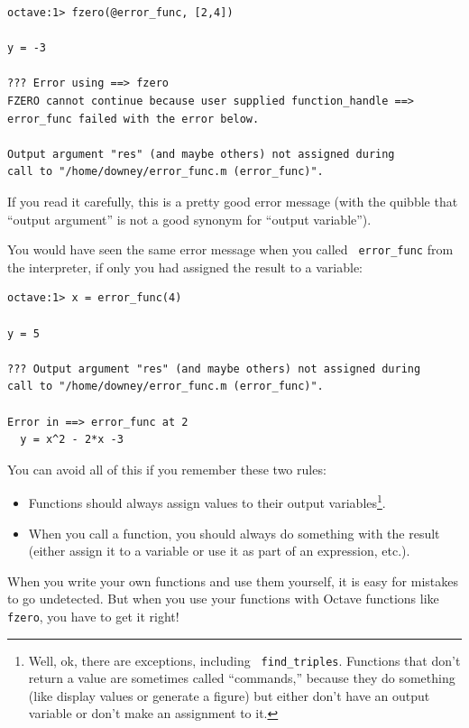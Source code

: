 \documentclass{book}
\begin{document}
\begin{verbatim}
octave:1> fzero(@error_func, [2,4])

y = -3

??? Error using ==> fzero
FZERO cannot continue because user supplied function_handle ==> 
error_func failed with the error below.

Output argument "res" (and maybe others) not assigned during 
call to "/home/downey/error_func.m (error_func)".
\end{verbatim}

If you read it carefully, this is a pretty good error message
(with the quibble that ``output argument'' is not a good synonym
for ``output variable'').

You would have seen the same error message when you called {\tt
error\_func} from the interpreter, if only you had assigned the result
to a variable:

\begin{verbatim}
octave:1> x = error_func(4)

y = 5

??? Output argument "res" (and maybe others) not assigned during 
call to "/home/downey/error_func.m (error_func)".

Error in ==> error_func at 2
  y = x^2 - 2*x -3
\end{verbatim}

You can avoid all of this if you remember these two rules:

\begin{itemize}

\item Functions should always assign values to their output
variables\footnote{Well, ok, there are exceptions, including {\tt
find\_triples}. Functions that don't return a value are sometimes
called ``commands,'' because they do something (like display values or
generate a figure) but either don't have an output variable or don't
make an assignment to it.}.

\item When you call a function, you should always do something with
the result (either assign it to a variable or use it as part of an
expression, etc.).

\end{itemize}

When you write your own functions and use them yourself, it is easy
for mistakes to go undetected. But when you use your functions with
Octave functions like {\tt fzero}, you have to get it right!
\end{document}
